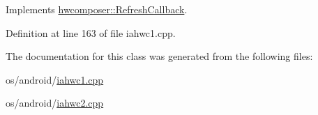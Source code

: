 Implements \mbox{\hyperlink{classhwcomposer_1_1RefreshCallback_a5637a4b1437bbf8c93d8356addbf7c87}{hwcomposer\+::\+Refresh\+Callback}}.



Definition at line 163 of file iahwc1.\+cpp.


\begin{DoxyCode}{0}
\end{DoxyCode}


The documentation for this class was generated from the following files\+:\begin{DoxyCompactItemize}
\item 
os/android/\mbox{\hyperlink{iahwc1_8cpp}{iahwc1.\+cpp}}\item 
os/android/\mbox{\hyperlink{iahwc2_8cpp}{iahwc2.\+cpp}}\end{DoxyCompactItemize}
